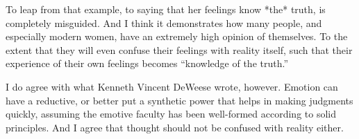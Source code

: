 \begin{footnotesize}
\begin{sffamily}
To leap from that example, to saying that her feelings know *the* truth, is completely misguided. And I think it demonstrates how many people, and especially modern women, have an extremely high opinion of themselves. To the extent that they will even confuse their feelings with reality itself, such that their experience of their own feelings becomes ``knowledge of the truth.''

I do agree with what Kenneth Vincent DeWeese wrote, however. Emotion can have a reductive, or better put a synthetic power that helps in making judgments quickly, assuming the emotive faculty has been well-formed according to solid principles. And I agree that thought should not be confused with reality either.


\hfill

\end{sffamily}
\end{footnotesize}

